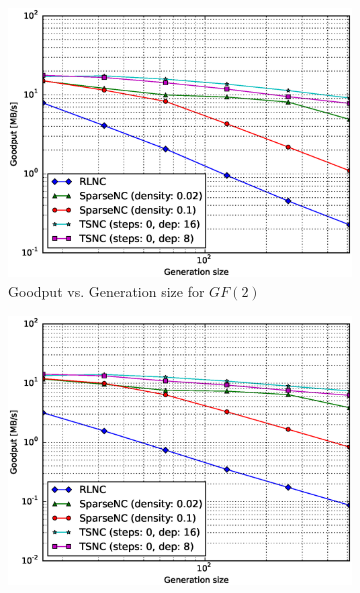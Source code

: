 \begin{figure}
    \centering
    \begin{subfigure}[b]{0.475\textwidth}
        \centering
        \includegraphics[width=1.15\textwidth]{images/23_07_2015/goodput_vs_generation_size_Rasp_encoder_Binary_1600.eps}
        \caption[]%
        {{\small Goodput vs. Generation size for $GF(2)$}}    
        \label{fig:enc_good_rasp1_gen_gf2}
    \end{subfigure}
    \hfill
    \begin{subfigure}[b]{0.475\textwidth}  
        \centering 
        \includegraphics[width=1.15\textwidth]{images/23_07_2015/goodput_vs_generation_size_Rasp_encoder_Binary8_1600.eps}

\end{subfigure}
\end{figure}
